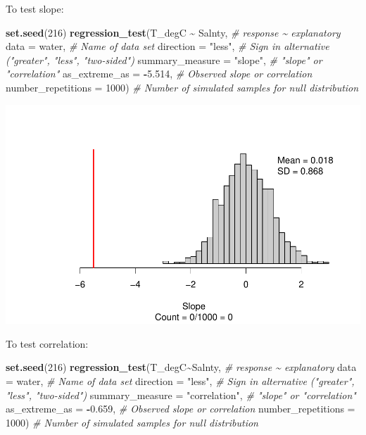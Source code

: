 \documentclass[
]{report}
\newenvironment{Shaded}{\begin{snugshade}}{\end{snugshade}}
\newcommand{\AttributeTok}[1]{\textcolor[rgb]{0.13,0.29,0.53}{#1}}
\newcommand{\CommentTok}[1]{\textcolor[rgb]{0.56,0.35,0.01}{\textit{#1}}}
\newcommand{\DecValTok}[1]{\textcolor[rgb]{0.00,0.00,0.81}{#1}}
\newcommand{\FloatTok}[1]{\textcolor[rgb]{0.00,0.00,0.81}{#1}}
\newcommand{\FunctionTok}[1]{\textcolor[rgb]{0.13,0.29,0.53}{\textbf{#1}}}
\newcommand{\NormalTok}[1]{#1}
\newcommand{\SpecialCharTok}[1]{\textcolor[rgb]{0.81,0.36,0.00}{\textbf{#1}}}
\newcommand{\StringTok}[1]{\textcolor[rgb]{0.31,0.60,0.02}{#1}}
\begin{document}
To test slope:

\begin{Shaded}
\begin{Highlighting}[]
\FunctionTok{set.seed}\NormalTok{(}\DecValTok{216}\NormalTok{)}
\FunctionTok{regression\_test}\NormalTok{(T\_degC }\SpecialCharTok{\textasciitilde{}}\NormalTok{ Salnty, }\CommentTok{\# response \textasciitilde{} explanatory}
               \AttributeTok{data =}\NormalTok{ water, }\CommentTok{\# Name of data set}
               \AttributeTok{direction =} \StringTok{"less"}\NormalTok{, }\CommentTok{\# Sign in alternative ("greater", "less", "two{-}sided")}
               \AttributeTok{summary\_measure =} \StringTok{"slope"}\NormalTok{, }\CommentTok{\# "slope" or "correlation"}
               \AttributeTok{as\_extreme\_as =} \SpecialCharTok{{-}}\FloatTok{5.514}\NormalTok{, }\CommentTok{\# Observed slope or correlation}
               \AttributeTok{number\_repetitions =} \DecValTok{1000}\NormalTok{) }\CommentTok{\# Number of simulated samples for null distribution}
\end{Highlighting}
\end{Shaded}

\begin{center}\includegraphics[width=0.7\linewidth]{13-LN013-regression_files/figure-latex/unnamed-chunk-5-1} \end{center}

To test correlation:

\begin{Shaded}
\begin{Highlighting}[]
\FunctionTok{set.seed}\NormalTok{(}\DecValTok{216}\NormalTok{)}
\FunctionTok{regression\_test}\NormalTok{(T\_degC}\SpecialCharTok{\textasciitilde{}}\NormalTok{Salnty, }\CommentTok{\# response \textasciitilde{} explanatory}
               \AttributeTok{data =}\NormalTok{ water, }\CommentTok{\# Name of data set}
               \AttributeTok{direction =} \StringTok{"less"}\NormalTok{, }\CommentTok{\# Sign in alternative ("greater", "less", "two{-}sided")}
               \AttributeTok{summary\_measure =} \StringTok{"correlation"}\NormalTok{, }\CommentTok{\# "slope" or "correlation"}
               \AttributeTok{as\_extreme\_as =} \SpecialCharTok{{-}}\FloatTok{0.659}\NormalTok{, }\CommentTok{\# Observed slope or correlation}
               \AttributeTok{number\_repetitions =} \DecValTok{1000}\NormalTok{) }\CommentTok{\# Number of simulated samples for null distribution}
\end{Highlighting}
\end{Shaded}
\end{document}
